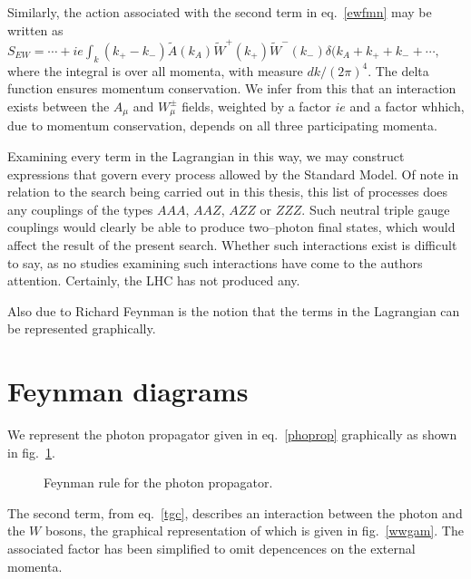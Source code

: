 Similarly, the action associated with the second term in eq.~\eqref{ewfmn} may be written as
\(S_\textit{EW}=\cdots+ie\int_k (k_{+}-k_{-})\tilde A(k_A)\tilde W^{+}(k_{+})\tilde W^{-}(k_{-})\delta(k_A+k_{+}+k_{-}+\cdots,\label{tgc}\)
where the integral is over all momenta, with measure $dk/(2\pi)^4$. The delta function ensures momentum conservation. We infer from this that an interaction exists between the $A_\mu$ and $W^\pm_\mu$ fields, weighted by a factor $ie$ and a factor whhich, due to momentum conservation, depends on all three participating momenta.

Examining every term in the Lagrangian in this way, we may construct expressions that govern every process allowed by the Standard Model. Of note in relation to the search being carried out in this thesis, this list of processes does any couplings of the types $AAA$, $AAZ$, $AZZ$ or $ZZZ$. Such neutral triple gauge couplings would clearly be able to produce two--photon final states, which would affect the result of the present search. Whether such interactions exist is difficult to say, as no studies examining such interactions have come to the authors attention. Certainly, the LHC has not produced any. 

Also due to Richard Feynman is the notion that the terms in the Lagrangian can be represented graphically.

\section{Feynman diagrams}
We represent the photon propagator given in eq.~\eqref{phoprop} graphically as shown in fig.~\ref{phoprop}.

\begin{figure}[hbtp]
\begin{minipage}[c]{.69\textwidth}\centering\footnotesize
{}
\end{minipage}\hfill
\begin{minipage}[c]{.3\textwidth}
\caption{Feynman rule for the photon propagator.}
\label{phoprop}
\end{minipage}
\end{figure}

The second term, from eq.~\eqref{tgc}, describes an interaction between the photon and the $W$ bosons, the graphical representation of which is given in fig.~\ref{wwgam}. The associated factor has been simplified to omit depencences on the external momenta.

